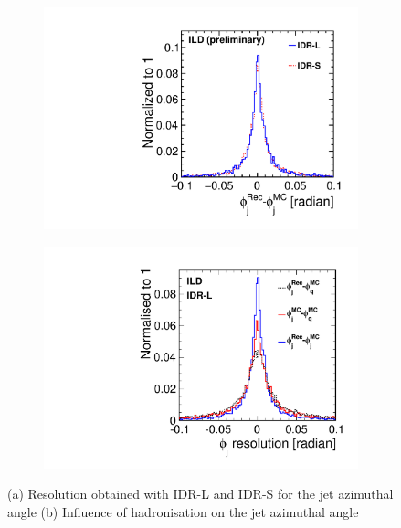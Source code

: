 \begin{figure}[htbp]
\begin{subfigure}{0.49\hsize} \includegraphics[width=\textwidth]{Performance/fig/phij1h.pdf}
 \caption{ \label{fig:mh:res:phi_LS}}
 \end{subfigure}
\begin{subfigure}{0.49\hsize} \includegraphics[width=\textwidth]{Performance/fig/phi_res.pdf}
 \caption{  \label{fig:mh:res:phi_hadronisation}}
 \end{subfigure}
\caption{
(a) Resolution obtained with IDR-L and IDR-S for the jet azimuthal angle
(b) Influence of hadronisation on the jet azimuthal angle
}
\label{fig:mh:res:phi}
\end{figure}

